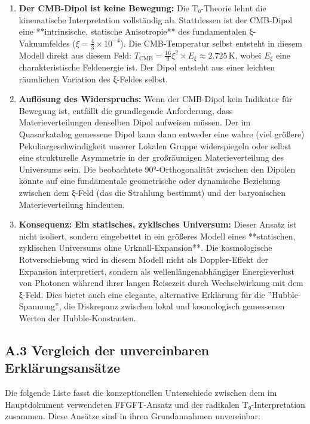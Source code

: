 \begin{enumerate}
	\item \textbf{Der CMB-Dipol ist keine Bewegung:} Die T₀-Theorie lehnt die kinematische Interpretation vollständig ab. Stattdessen ist der CMB-Dipol eine **intrinsische, statische Anisotropie** des fundamentalen ξ-Vakuumfeldes ($ \xi = \frac{4}{3} \times 10^{-4} $). Die CMB-Temperatur selbst entsteht in diesem Modell direkt aus diesem Feld: $ T_{\text{CMB}} = \frac{16}{9} \xi^2 \times E_\xi \approx 2.725 \, \text{K} $, wobei $E_\xi$ eine charakteristische Feldenergie ist. Der Dipol entsteht aus einer leichten räumlichen Variation des ξ-Feldes selbst.
	
	\item \textbf{Auflösung des Widerspruchs:} Wenn der CMB-Dipol kein Indikator für Bewegung ist, entfällt die grundlegende Anforderung, dass Materieverteilungen denselben Dipol aufweisen müssen. Der im Quasarkatalog gemessene Dipol kann dann entweder eine wahre (viel größere) Pekuliargeschwindigkeit unserer Lokalen Gruppe widerspiegeln oder selbst eine strukturelle Asymmetrie in der großräumigen Materieverteilung des Universums sein. Die beobachtete 90°-Orthogonalität zwischen den Dipolen könnte auf eine fundamentale geometrische oder dynamische Beziehung zwischen dem ξ-Feld (das die Strahlung bestimmt) und der baryonischen Materieverteilung hindeuten.
	
	\item \textbf{Konsequenz: Ein statisches, zyklisches Universum:} Dieser Ansatz ist nicht isoliert, sondern eingebettet in ein größeres Modell eines **statischen, zyklischen Universums ohne Urknall-Expansion**. Die kosmologische Rotverschiebung wird in diesem Modell nicht als Doppler-Effekt der Expansion interpretiert, sondern als wellenlängenabhängiger Energieverlust von Photonen während ihrer langen Reisezeit durch Wechselwirkung mit dem ξ-Feld. Dies bietet auch eine elegante, alternative Erklärung für die ''Hubble-Spannung'', die Diskrepanz zwischen lokal und kosmologisch gemessenen Werten der Hubble-Konstanten.
\end{enumerate}

\subsection*{A.3 Vergleich der unvereinbaren Erklärungsansätze}

Die folgende Liste fasst die konzeptionellen Unterschiede zwischen dem im Hauptdokument verwendeten FFGFT-Ansatz und der radikalen T₀-Interpretation zusammen. Diese Ansätze sind in ihren Grundannahmen unvereinbar:

